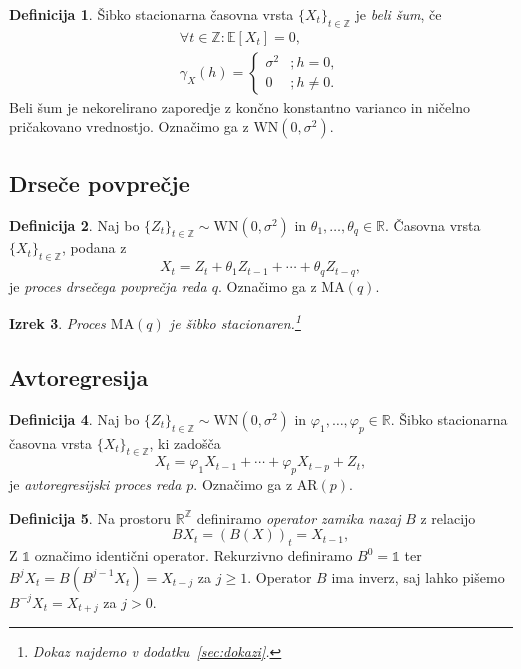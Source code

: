 \documentclass[11pt]{amsart}
\newcommand{\Z}{\mathbb{Z}}
\newcommand{\R}{\mathbb{R}}
\newcommand{\E}{\mathbb{E}}
\newcommand{\WN}{\mathrm{WN}}
\theoremstyle{definition}
\newtheorem{definicija}{Definicija}[section]
\theoremstyle{plain}
\newtheorem{izrek}[definicija]{Izrek}
\begin{document}
\begin{definicija}
    Šibko stacionarna časovna vrsta $\{X_t\}_{t \in \Z}$ je \emph{beli šum}, če
    \begin{gather*}
        \forall t \in \Z \colon \E[X_t] = 0, \\
        \gamma_X(h) = 
            \begin{cases}
                \sigma^2 &; h = 0, \\
                0 &; h \neq 0.
            \end{cases}
    \end{gather*}
    Beli šum je nekorelirano zaporedje z končno konstantno varianco in ničelno pričakovano vrednostjo.
    Označimo ga z $\WN(0, \sigma^2)$.
\end{definicija}

\subsection*{Drseče povprečje}

\begin{definicija}
    Naj bo $\{Z_t\}_{t \in \Z} \sim \WN(0,\sigma^2)$ in $\theta_1, \ldots, \theta_q \in \R$.
    Časovna vrsta $\{X_t\}_{t \in \Z}$, podana z
    \[
        X_t = Z_t + \theta_1 Z_{t-1} + \cdots + \theta_q Z_{t-q},
    \]
    je \emph{proces drsečega povprečja reda $q$}. Označimo ga z $\mathrm{MA}(q)$.
\end{definicija}

\begin{izrek}\label{the:MA}
    Proces $\mathrm{MA}(q)$ je šibko stacionaren.\footnote{Dokaz najdemo v dodatku~\ref{sec:dokazi}.}
\end{izrek}

\subsection*{Avtoregresija}

\begin{definicija}
    Naj bo $\{Z_t\}_{t \in \Z} \sim \WN(0,\sigma^2)$ in $\varphi_1, \ldots, \varphi_p \in \R$.
    Šibko stacionarna časovna vrsta $\{X_t\}_{t \in \Z}$, ki zadošča
    \[
        X_t = \varphi_1 X_{t-1} + \cdots + \varphi_p X_{t-p} + Z_t,
    \]
    je \emph{avtoregresijski proces reda $p$}. Označimo ga z $\mathrm{AR}(p)$.
\end{definicija}

\begin{definicija}
    Na prostoru $\R^{\Z}$ definiramo \emph{operator zamika nazaj} $B$ z relacijo
    \[
        BX_t = (B(X))_t = X_{t-1},
    \]
    Z $\mathds{1}$ označimo identični operator. Rekurzivno definiramo $B^0 = \mathds{1}$ ter
    $B^j X_t = B(B^{j-1} X_t) = X_{t-j}$ za $j \geq 1$. Operator $B$ ima inverz, saj lahko 
    pišemo $B^{-j} X_t = X_{t+j}$ za $j > 0$.
\end{definicija}
\end{document}
